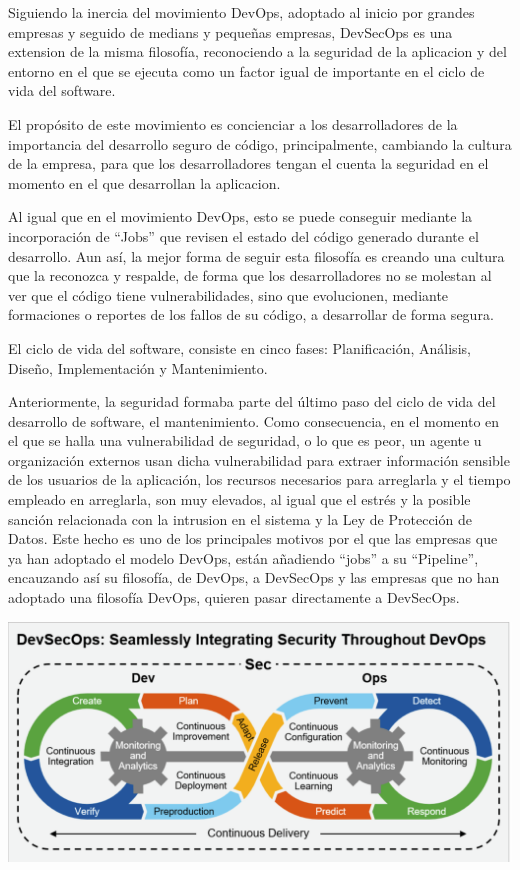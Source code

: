 \documentclass[12pt]{report} %
\begin{document}
Siguiendo la inercia del movimiento DevOps, adoptado al inicio por grandes empresas y seguido de medians y pequeñas empresas, DevSecOps es una extension de la misma filosofía, reconociendo a la seguridad de la aplicacion y del entorno en el que se ejecuta como un factor igual de importante en el ciclo de vida del software.

El propósito de este movimiento es concienciar a los desarrolladores de la importancia del desarrollo seguro de código, principalmente, cambiando la cultura de la empresa, para que los desarrolladores tengan el cuenta la seguridad en el momento en el que desarrollan la aplicacion.

Al igual que en el movimiento DevOps, esto se puede conseguir mediante la incorporación de ``Jobs'' que revisen el estado del código generado durante el desarrollo.
Aun así, la mejor forma de seguir esta filosofía es creando una cultura que la reconozca y respalde, de forma que los desarrolladores no se molestan al ver que el código tiene vulnerabilidades, sino que evolucionen, mediante formaciones o reportes de los fallos de su código, a desarrollar de forma segura.

El ciclo de vida del software, consiste en cinco fases: Planificación, Análisis, Diseño, Implementación y Mantenimiento.


Anteriormente, la seguridad formaba parte del último paso del ciclo de vida del desarrollo de software, el mantenimiento.
Como consecuencia, en el momento en el que se halla una vulnerabilidad de seguridad, o lo que es peor, un agente u organización externos usan dicha vulnerabilidad para extraer información sensible de los usuarios de la aplicación, los recursos necesarios para arreglarla y el tiempo empleado en arreglarla, son muy elevados, al igual que el estrés y la posible sanción relacionada con la intrusion en el sistema y la Ley de Protección de Datos.
Este hecho es uno de los principales motivos por el que las empresas que ya han adoptado el modelo DevOps, están añadiendo ``jobs'' a su ``Pipeline'', encauzando así su filosofía, de DevOps, a DevSecOps y las empresas que no han adoptado una filosofía DevOps, quieren pasar directamente a DevSecOps.

\includegraphics[width=\textwidth]{devsecops.png}
\end{document}
